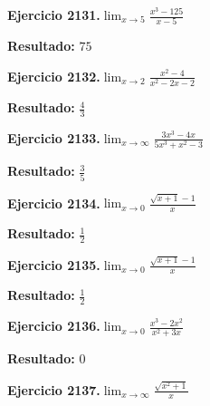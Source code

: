 \documentclass[10pt,a4paper]{article}
\begin{document}
\begin{ejbox}
\textbf{Ejercicio 2131.}\quad $\lim_{x\to 5} \frac{x^3-125}{x-5}$
\end{ejbox}

\begin{solbox}
\textbf{Resultado:} \(\displaystyle 75\)
\end{solbox}

\newpage
\begin{ejbox}
\textbf{Ejercicio 2132.}\quad $\lim_{x\to 2} \frac{x^2-4}{x^2-2x-2}$
\end{ejbox}

\begin{solbox}
\textbf{Resultado:} \(\displaystyle \frac{4}{3}\)
\end{solbox}

\begin{ejbox}
\textbf{Ejercicio 2133.}\quad $\lim_{x\to \infty} \frac{3x^3 - 4x}{5x^3 + x^2 - 3}$
\end{ejbox}

\begin{solbox}
\textbf{Resultado:} \(\displaystyle \frac{3}{5}\)
\end{solbox}

\begin{ejbox}
\textbf{Ejercicio 2134.}\quad $\lim_{x\to 0} \frac{\sqrt{x+1}-1}{x}$
\end{ejbox}

\begin{solbox}
\textbf{Resultado:} \(\displaystyle \frac{1}{2}\)
\end{solbox}

\newpage
\begin{ejbox}
\textbf{Ejercicio 2135.}\quad $\lim_{x\to 0} \frac{\sqrt{x+1}-1}{x}$
\end{ejbox}

\begin{solbox}
\textbf{Resultado:} \(\displaystyle \frac{1}{2}\)
\end{solbox}

\begin{ejbox}
\textbf{Ejercicio 2136.}\quad $\lim_{x\to 0} \frac{x^3-2x^2}{x^2+3x}$
\end{ejbox}

\begin{solbox}
\textbf{Resultado:} \(\displaystyle 0\)
\end{solbox}

\begin{ejbox}
\textbf{Ejercicio 2137.}\quad $\lim_{x\to \infty} \frac{\sqrt{x^2+1}}{x}$
\end{ejbox}
\end{document}
